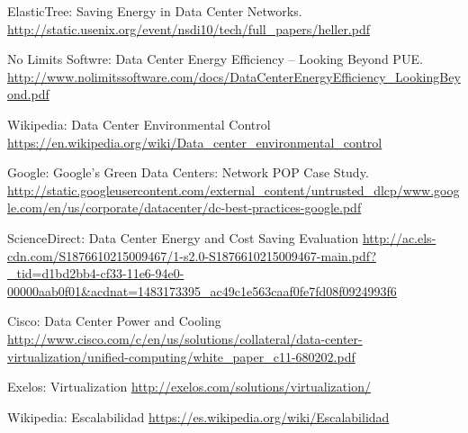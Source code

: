 \documentclass[10pt]{article}
\begin{document}
\begin{thebibliography}{9}
		ElasticTree: Saving Energy in Data Center Networks. \newline
		\url{http://static.usenix.org/event/nsdi10/tech/full_papers/heller.pdf}

		No Limits Softwre: Data Center Energy Efficiency – Looking Beyond PUE. \newline
		\url{http://www.nolimitssoftware.com/docs/DataCenterEnergyEfficiency_LookingBeyond.pdf}

		Wikipedia: Data Center Environmental Control \newline
		\url{https://en.wikipedia.org/wiki/Data_center_environmental_control}

		Google: Google’s Green Data Centers: Network POP Case Study.\newline
		\url{http://static.googleusercontent.com/external_content/untrusted_dlcp/www.google.com/en/us/corporate/datacenter/dc-best-practices-google.pdf}

		ScienceDirect: Data Center Energy and Cost Saving Evaluation \newline
		\url{http://ac.els-cdn.com/S1876610215009467/1-s2.0-S1876610215009467-main.pdf?_tid=d1bd2bb4-cf33-11e6-94e0-00000aab0f01&acdnat=1483173395_ac49c1e563caaf0fe7fd08f0924993f6}

		Cisco: Data Center Power and Cooling \newline
		\url{http://www.cisco.com/c/en/us/solutions/collateral/data-center-virtualization/unified-computing/white_paper_c11-680202.pdf}

		Exelos: Virtualization \newline
		\url{http://exelos.com/solutions/virtualization/}

		Wikipedia: Escalabilidad \newline
		\url{https://es.wikipedia.org/wiki/Escalabilidad}

	\end{thebibliography}
\end{document}
